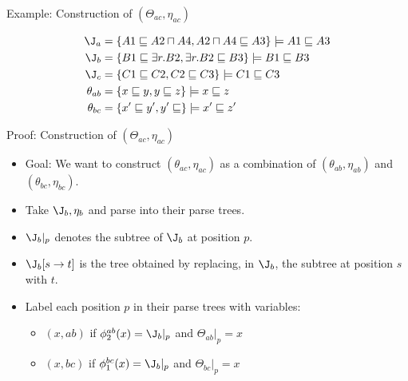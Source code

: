 \documentclass{beamer}
\begin{document}
\begin{frame}{Example: Construction of $(\Theta_{ac}, \eta_{ac})$}

\centering
\scalebox{0.7}{}
\begin{align*}
\J_{a} &= \{A1 \sqsubseteq A2 \sqcap A4, A2 \sqcap A4 \sqsubseteq A3 \} \models A1 \sqsubseteq A3  \\ 
\J_{b} &= \{ B1 \sqsubseteq \exists r.B2, \exists r.B2 \sqsubseteq B3\} \models B1 \sqsubseteq B3 \\
\J_{c} &= \{ C1 \sqsubseteq C2, C2  \sqsubseteq C3 \} \models C1 \sqsubseteq C3 \\
\theta_{ab} &= \{ x \sqsubseteq y, y  \sqsubseteq z\} \models x \sqsubseteq z \\
\theta_{bc} &= \{ x' \sqsubseteq y', y'  \sqsubseteq \} \models x' \sqsubseteq z'
\end{align*}

\end{frame}



\begin{frame}{Proof: Construction of $(\Theta_{ac}, \eta_{ac})$}

\centering
\scalebox{0.5}{%

}

\begin{itemize}
\item Goal: We want to construct $(\theta_{ac}, \eta_{ac})$ as a combination of $(\theta_{ab}, \eta_{ab})$ and $(\theta_{bc}, \eta_{bc})$.
\item Take $\J_{b}, \eta_{b}$ and parse into their parse trees. 
\item $\J_{b}|_{p}$ denotes the subtree of $\J_{b}$ at position $p$.
\item $\J_{b}[s \rightarrow t]$ is the tree obtained by replacing, in $\J_{b}$, the subtree at position $s$ with $t$.
\item Label each position $p$ in their parse trees with variables:
\begin{itemize}
\item $(x, ab)$ if $\phi^{ab}_{2}(x) = \J_{b}|_{p}$ and $\Theta_{ab}|_{p} = x$
\item $(x, bc)$ if $\phi^{bc}_{1}(x) = \J_{b}|_{p}$ and $\Theta_{bc}|_{p} = x$
\end{itemize}
\end{itemize}


\end{frame}
\end{document}
